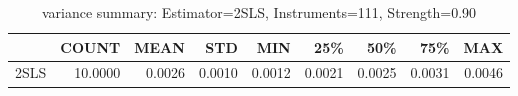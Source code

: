 \begin{table}[ht]
\centering
\caption{variance summary: Estimator=2SLS, Instruments=111, Strength=0.90}
\begin{tabular}{lrrrrrrrr}
\toprule
 & COUNT & MEAN & STD & MIN & 25\% & 50\% & 75\% & MAX \\
\midrule
2SLS & 10.0000 & 0.0026 & 0.0010 & 0.0012 & 0.0021 & 0.0025 & 0.0031 & 0.0046 \\
\bottomrule
\end{tabular}
\end{table}
